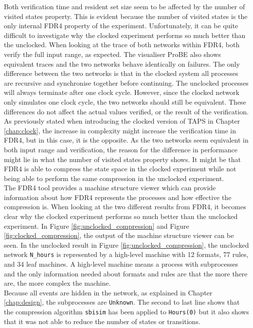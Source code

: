 Both verification time and resident set size seem to be affected by the number of visited states property. This is evident because the
number of visited states is the only internal FDR4 property of the experiment. Unfortunately, it can be quite difficult to investigate why the clocked experiment performs so much better than the unclocked. When looking at the trace of both networks within FDR4, both verify the full input range, as expected. The visualiser ProBE also shows equivalent traces and the two networks behave identically on failures. The only difference between the two networks is that in the clocked system all processes are recursive and synchronise together before continuing. The unclocked processes will always terminate after one clock cycle. However, since the clocked network only simulates one clock cycle, the two networks should still be equivalent. These differences do not affect the actual values verified, or the result of the verification. \\

As previously stated when introducing the clocked version of TAPS in Chapter \ref{chap:clock}, the increase in complexity might increase the verification time in FDR4, but in this case, it is the opposite.
As the two networks seem equivalent in both input range and verification, the reason for the difference in performance might lie in what the number of visited states property shows. It might be that FDR4 is able to compress the state space in the clocked experiment while not being able to perform the same compression in the unclocked experiment. \\

The FDR4 tool provides a machine structure viewer which can provide information about how FDR4 represents the processes and how effective the compression is. When looking at the two different results from FDR4, it becomes clear why the clocked experiment performs so much better than the unclocked experiment. In Figure \ref{fig:unclocked_compression} and Figure \ref{fig:clocked_compression}, the output of the machine structure viewer can be seen. In the unclocked result in Figure \ref{fig:unclocked_compression}, the unclocked network
\texttt{N\_hours} is represented by a high-level machine with 12 formats, 77 rules, and 34 leaf machines. A high-level machine means a process with subprocesses and the only information needed about formats and rules are that the more there are, the more complex the machine. \\

Because all events are hidden in the network, as explained in Chapter \ref{chap:design}, the subprocesses are \texttt{Unknown}. The second to last line shows that the compression algorithm \texttt{sbisim} has been applied to \texttt{Hours(0)} but it also shows that it was not able to reduce the number of states or transitions. \\

